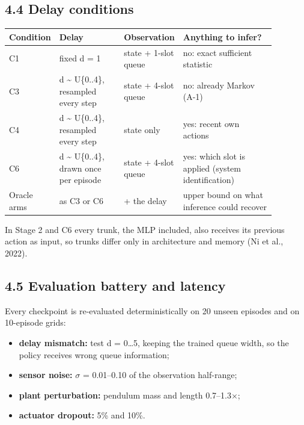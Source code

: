 \documentclass[11pt]{article}
\begin{document}
\subsection*{4.4 Delay conditions}



\begin{center}\small\begin{tabular}{>{\raggedright\arraybackslash}p{0.103\linewidth}>{\raggedright\arraybackslash}p{0.257\linewidth}>{\raggedright\arraybackslash}p{0.150\linewidth}>{\raggedright\arraybackslash}p{0.368\linewidth}}
\toprule
Condition & Delay & Observation & Anything to infer? \\
\midrule
C1 & fixed d = 1 & state + 1-slot queue & no: exact sufficient statistic \\
C3 & d \textasciitilde{} U\{0..4\}, resampled every step & state + 4-slot queue & no: already Markov (A-1) \\
C4 & d \textasciitilde{} U\{0..4\}, resampled every step & state only & yes: recent own actions \\
C6 & d \textasciitilde{} U\{0..4\}, drawn once per episode & state + 4-slot queue & yes: which slot is applied (system identification) \\
Oracle arms & as C3 or C6 & + the delay & upper bound on what inference could recover \\
\bottomrule
\end{tabular}\end{center}



In Stage 2 and C6 every trunk, the MLP included, also receives its previous action as input, so trunks differ only in architecture and memory (Ni et al., 2022).



\subsection*{4.5 Evaluation battery and latency}



Every checkpoint is re-evaluated deterministically on 20 unseen episodes and on 10-episode grids:

\begin{itemize}
\item \textbf{delay mismatch:} test d = 0\ldots{}5, keeping the trained queue width, so the policy receives wrong queue information;
\item \textbf{sensor noise:} $\sigma$ = 0.01--0.10 of the observation half-range;
\item \textbf{plant perturbation:} pendulum mass and length 0.7--1.3$\times$;
\item \textbf{actuator dropout:} 5\% and 10\%.
\end{itemize}
\end{document}
